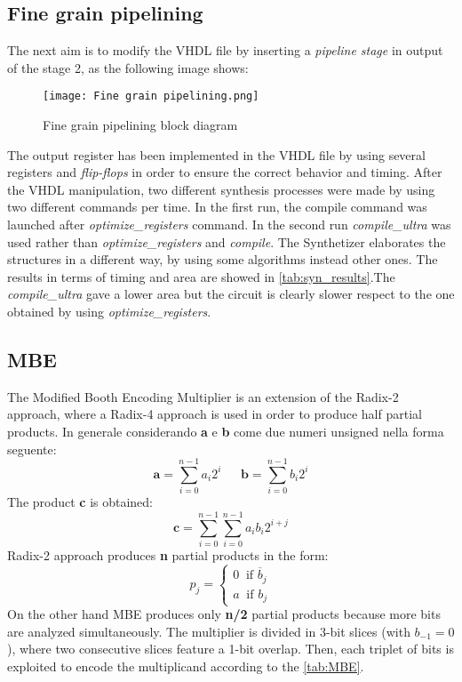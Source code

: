 
\subsection{Fine grain pipelining}
The next aim is to modify the VHDL file by inserting a \textit{pipeline stage} in output of the stage 2, as the following image shows:
\begin{figure}[H]
	\center
	\texttt{[image: Fine grain pipelining.png]}
	\caption{Fine grain pipelining block diagram}
	\label{fig:mult_struct}
\end{figure}
The output register has been implemented in the VHDL file by using several registers and \textit{flip-flops} in order to ensure the correct behavior and timing.  After the VHDL manipulation, two different synthesis processes were made by using two different commands per time. In the first run, the compile command was launched after \textit{optimize\_registers} command. In the second run  \textit{compile\_ultra} was used rather than \textit{optimize\_registers} and \textit{compile}. The Synthetizer elaborates the structures in a different way, by using some algorithms instead other ones. The results in terms of timing and area are showed in \autoref{tab:syn_results}.The \textit{compile\_ultra} gave a lower area but the circuit is clearly slower respect to the one obtained by using \textit{optimize\_registers}.
\subsection{MBE}
The Modified Booth Encoding Multiplier is an extension of the Radix-2 approach, where a Radix-4 approach is used in order to produce half partial products. In generale considerando \textbf{a} e \textbf{b} come due numeri unsigned nella forma seguente:
$$
\textbf{a} = \sum_{i=0}^{n-1}a_i2^i\ \ \ \ \ \ \  \textbf{b} = \sum_{i=0}^{n-1}b_i2^i
$$
The product \textbf{c} is obtained:
$$
\textbf{c} = \sum_{i=0}^{n-1}\sum_{i=0}^{n-1}a_ib_i2^{i+j}
$$
Radix-2 approach produces \textbf{n} partial products in the form:
$$
p_j = 
\begin{cases}
0 \ \textrm{  if   } \overline{b}_j\\
a \ \textrm{  if   } {b}_j
\end{cases}
$$
On the other hand MBE produces only \textbf{n/2} partial products because more bits are analyzed simultaneously. The multiplier is divided in 3-bit slices (with $b_{-1} = 0$), where two consecutive slices feature a 1-bit overlap. Then, each triplet of bits is exploited to encode the multiplicand according to the \autoref{tab:MBE}.


